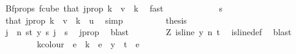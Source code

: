 \begin{isabellebody}
\ Bf{\isacharunderscore}{\kern0pt}props{\isacharparenleft}{\kern0pt}{}{\isacharparenright}{\kern0pt}\ f{\isacharunderscore}{\kern0pt}cube\ that\ j{\isacharunderscore}{\kern0pt}prop\ {\isacartoucheopen}k\ {\isacharminus}{\kern0pt}\ v\ {\isacharless}{\kern0pt}\ k{\isacartoucheclose}\ \isamarkupfalse%
\ fast\isanewline
\ \ \ \ \ \ \isamarkupfalse%
\ \isamarkupfalse%
\ {\isachardoublequoteopen}\ {\isachardot}{\kern0pt}{\isachardot}{\kern0pt}{\isachardot}{\kern0pt}\ {\isacharequal}{\kern0pt}\ s{\isachardoublequoteclose}\ \isamarkupfalse%
\ that\ j{\isacharunderscore}{\kern0pt}prop\ {\isacartoucheopen}k\ {\isacharminus}{\kern0pt}\ v\ {\isacharless}{\kern0pt}\ k\ {\isacharminus}{\kern0pt}\ u{\isacartoucheclose}\ \isamarkupfalse%
\ simp\isanewline
\ \ \ \ \ \ \isamarkupfalse%
\ \isamarkupfalse%
\ {\isacharquery}{\kern0pt}thesis\ \isacommand{{\isachardot}{\kern0pt}}\isamarkupfalse%
\isanewline
\ \ \ \ \isamarkupfalse%
\isanewline
\ \ \ \ \isamarkupfalse%
\ \isamarkupfalse%
\ {\isachardoublequoteopen}{\isasymexists}j\ {\isacharless}{\kern0pt}\ n{\isachardot}{\kern0pt}\ {\isasymforall}s{\isacharless}{\kern0pt}t{\isacharplus}{\kern0pt}{}{\isachardot}{\kern0pt}\ y\ s\ j\ {\isacharequal}{\kern0pt}\ s{\isachardoublequoteclose}\ \isamarkupfalse%
\ j{\isacharunderscore}{\kern0pt}prop\ \isamarkupfalse%
\ blast\isanewline
\ \ \isamarkupfalse%
\isanewline
\ \ \isamarkupfalse%
\ \isamarkupfalse%
\ Z{}{\isacharcolon}{\kern0pt}\ {\isachardoublequoteopen}is{\isacharunderscore}{\kern0pt}line\ y\ n\ {\isacharparenleft}{\kern0pt}t{\isacharplus}{\kern0pt}{}{\isacharparenright}{\kern0pt}{\isachardoublequoteclose}\ \isamarkupfalse%
\ is{\isacharunderscore}{\kern0pt}line{\isacharunderscore}{\kern0pt}def\ \isamarkupfalse%
\ blast\isanewline
\ \ \isamarkupfalse%
\ \isanewline
\ \ \isacommand{{\isacharbraceleft}{\kern0pt}}\isamarkupfalse%
\isanewline
\ \ \ \ \isamarkupfalse%
\ k{\isacharunderscore}{\kern0pt}colour{\isacharcolon}{\kern0pt}\ {\isachardoublequoteopen}{\isasymchi}\ e\ {\isacharless}{\kern0pt}\ k{\isachardoublequoteclose}\ \ {\isachardoublequoteopen}e\ {\isasymin}\ y\ {\isacharbackquote}{\kern0pt}\ {\isacharbraceleft}{\kern0pt}{\isachardot}{\kern0pt}{\isachardot}{\kern0pt}{\isacharless}{\kern0pt}t{\isacharplus}{\kern0pt}{}{\isacharbraceright}{\kern0pt}{\isachardoublequoteclose}\ \ e\ \isamarkupfalse%

\end{isabellebody}
